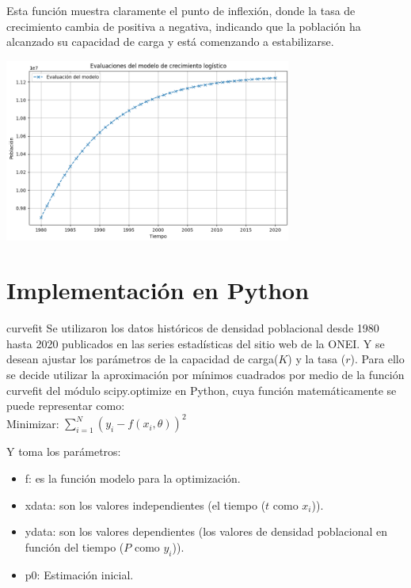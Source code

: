 \documentclass{beamer}
\begin{document}
\begin{frame}
    Esta función muestra claramente el punto de inflexión, donde la tasa de crecimiento cambia de positiva a negativa, indicando que la población 
    ha alcanzado su capacidad de carga y está comenzando a estabilizarse.
\begin{center}
    \includegraphics[height= 6cm]{img/model.png}
\end{center}
\end{frame}

\section{Implementación en Python}
\begin{frame}{curvefit}
    Se utilizaron los datos históricos de densidad poblacional desde 1980 hasta 2020 publicados en las series estadísticas del sitio web de la ONEI. Y se desean ajustar los parámetros de la capacidad de carga($K$) y la tasa ($r$).
    Para ello se decide utilizar la aproximación por mínimos cuadrados por medio de la función curvefit del módulo scipy.optimize en Python, cuya función matemáticamente se puede representar como:\\
    Minimizar: $\sum_{i=1}^{N} (y_{i} - f(x_{i}, \theta))^2 $ \\
    \begin{block}{Y toma los parámetros:}
    \begin{itemize}
        \item f: es la función modelo para la optimización.
        \item xdata: son los valores independientes (el tiempo ($t$ como $x_{i}$)).
        \item ydata: son los valores dependientes (los valores de densidad poblacional en función del tiempo ($P$ como $y_{i}$)).
        \item p0: Estimación inicial.
    \end{itemize}
    \end{block}
\end{frame}
\end{document}
